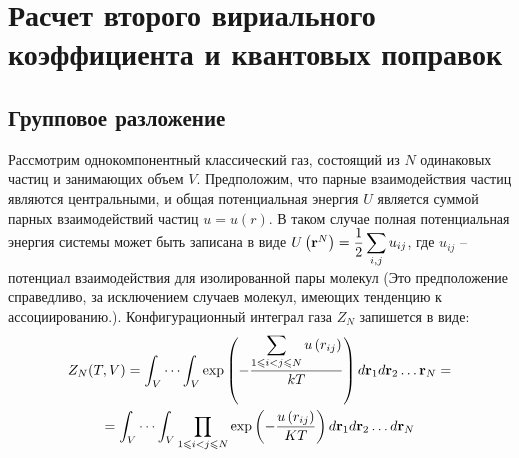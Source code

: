 \section{Расчет второго вириального коэффициента и квантовых поправок}

\subsection{Групповое разложение}

Рассмотрим однокомпонентный классический газ, состоящий из $N$ одинаковых частиц и занимающих объем $V$. Предположим, что парные взаимодействия частиц являются центральными, и общая потенциальная энергия $U$ является суммой парных взаимодействий частиц $u = u(r)$. В таком случае полная потенциальная энергия системы может быть записана в виде $U \left( \mathbf{r}^N \right) = \displaystyle \dfrac{1}{2} \sum_{i, j} u_{ij}$, где $u_{ij}$ -- потенциал взаимодействия для изолированной пары молекул (Это предположение справедливо, за исключением случаев молекул, имеющих тенденцию к ассоциированию.). Конфигурационный интеграл газа $Z_N$ запишется в виде:
\vverh
\begin{gather}
	Z_N (T, V) = \int_V \cdots \int_V \exp \left( - \frac{\displaystyle\sum_{1 \leqslant i < j \leqslant N} u \left( r_{ij} \right)}{kT} \right) d \mathbf{r}_1 d \mathbf{r}_2 \dots \mathbf{r}_N = \notag \\
	= \int_V \cdots \int_V \prod_{1 \leqslant i < j \leqslant N} \exp \left( - \frac{u \left( r_{ij} \right)}{KT} \right) d \mathbf{r}_1 d \mathbf{r}_2 \dots d \mathbf{r}_N \label{confint}
\end{gather}

